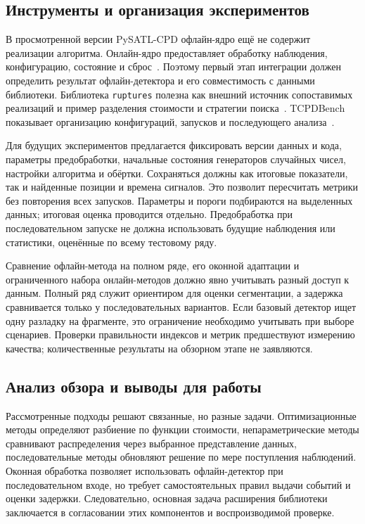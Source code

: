 \subsection{Инструменты и организация экспериментов}

В просмотренной версии PySATL-CPD офлайн-ядро ещё не содержит
реализации алгоритма. Онлайн-ядро предоставляет обработку
наблюдения, конфигурацию, состояние и сброс~\cite{pysatl}.
Поэтому первый этап интеграции должен определить результат
офлайн-детектора и его совместимость с данными библиотеки.
Библиотека \texttt{ruptures} полезна как внешний источник
сопоставимых реализаций и пример разделения стоимости и
стратегии поиска~\cite{ruptures}. TCPDBench показывает организацию
конфигураций, запусков и последующего анализа~\cite{tcpdbench}.

Для будущих экспериментов предлагается фиксировать версии данных
и кода, параметры предобработки, начальные состояния генераторов
случайных чисел,
настройки алгоритма и обёртки. Сохраняться должны как итоговые
показатели, так и найденные позиции и времена сигналов.
Это позволит пересчитать метрики без повторения всех запусков.
Параметры и пороги подбираются на выделенных данных;
итоговая оценка проводится отдельно. Предобработка при
последовательном запуске не должна использовать будущие наблюдения
или статистики, оценённые по всему тестовому ряду.

Сравнение офлайн-метода на полном ряде, его оконной адаптации
и ограниченного набора онлайн-методов должно явно учитывать
разный доступ к данным. Полный ряд служит ориентиром для оценки
сегментации, а задержка сравнивается только у последовательных
вариантов. Если базовый детектор ищет одну разладку на фрагменте,
это ограничение необходимо учитывать при выборе сценариев.
Проверки правильности индексов и метрик предшествуют измерению
качества; количественные результаты на обзорном этапе не заявляются.

\subsection{Анализ обзора и выводы для работы}

Рассмотренные подходы решают связанные, но разные задачи.
Оптимизационные методы определяют разбиение по функции стоимости,
непараметрические методы сравнивают распределения через выбранное
представление данных, последовательные методы обновляют решение
по мере поступления наблюдений. Оконная обработка позволяет
использовать офлайн-детектор при последовательном входе,
но требует самостоятельных правил выдачи событий и оценки задержки.
Следовательно, основная задача расширения библиотеки заключается
в согласовании этих компонентов и воспроизводимой проверке.

